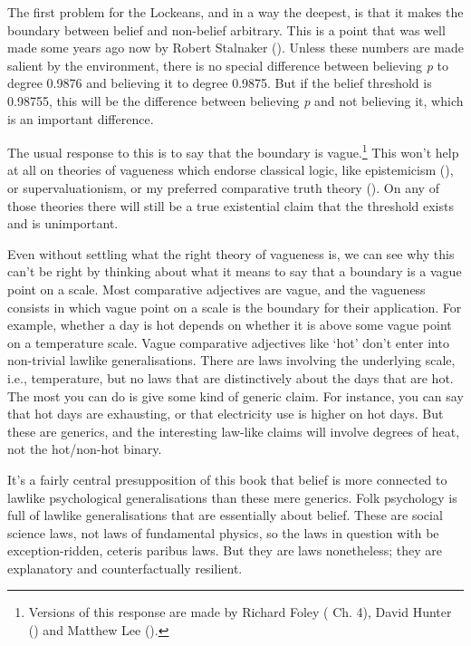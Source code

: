 \documentclass[
  10pt,
  letterpaper,
  twoside]{scrbook}
\begin{document}
The first problem for the Lockeans, and in a way the deepest, is that it
makes the boundary between belief and non-belief arbitrary. This is a
point that was well made some years ago now by Robert Stalnaker
(). Unless these numbers are made
salient by the environment, there is no special difference between
believing \emph{p} to degree 0.9876 and believing it to degree 0.9875.
But if the belief threshold is 0.98755, this will be the difference
between believing \emph{p} and not believing it, which is an important
difference.

The usual response to this is to say that the boundary is
vague.\footnote{Versions of this response are made by Richard Foley
  ( Ch. 4), David Hunter
  () and Matthew Lee
  ().} This won't help at all on theories
of vagueness which endorse classical logic, like epistemicism
(), or supervaluationism,
or my preferred comparative truth theory
(). On any of those
theories there will still be a true existential claim that the threshold
exists and is unimportant.

Even without settling what the right theory of vagueness is, we can see
why this can't be right by thinking about what it means to say that a
boundary is a vague point on a scale. Most comparative adjectives are
vague, and the vagueness consists in which vague point on a scale is the
boundary for their application. For example, whether a day is hot
depends on whether it is above some vague point on a temperature scale.
Vague comparative adjectives like `hot' don't enter into non-trivial
lawlike generalisations. There are laws involving the underlying scale,
i.e., temperature, but no laws that are distinctively about the days
that are hot. The most you can do is give some kind of generic claim.
For instance, you can say that hot days are exhausting, or that
electricity use is higher on hot days. But these are generics, and the
interesting law-like claims will involve degrees of heat, not the
hot/non-hot binary.

It's a fairly central presupposition of this book that belief is more
connected to lawlike psychological generalisations than these mere
generics. Folk psychology is full of lawlike generalisations that are
essentially about belief. These are social science laws, not laws of
fundamental physics, so the laws in question with be exception-ridden,
ceteris paribus laws. But they are laws nonetheless; they are
explanatory and counterfactually resilient.
\end{document}

